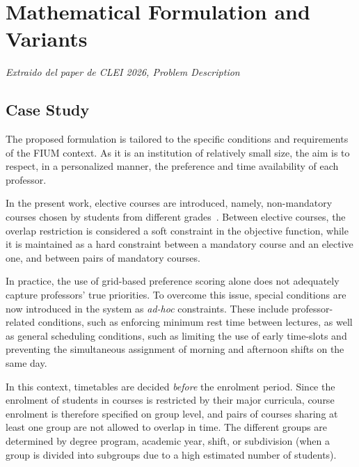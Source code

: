 \section{Mathematical Formulation and Variants}

\textit{Extraido del paper de CLEI 2026, Problem Description}


\subsection{Case Study}

The proposed formulation is tailored to the specific conditions and requirements of the FIUM context. As it is an institution of relatively small size, the aim is to respect, in a personalized manner, the preference and time availability of each professor.


In the present work, elective courses are introduced, namely, non-mandatory courses chosen by students from different grades~\cite{kristiansen2011elective}. Between elective courses, the overlap restriction is considered a soft constraint in the objective function, while it is maintained as a hard constraint between a mandatory course and an elective one, and between pairs of mandatory courses.

In practice, the use of grid-based preference scoring alone does not adequately capture professors' true priorities. To overcome this issue, special conditions are now introduced in the system as \textit{ad-hoc} constraints. These include professor-related conditions, such as enforcing minimum rest time between lectures, as well as general scheduling conditions, such as limiting the use of early time-slots and preventing the simultaneous assignment of morning and afternoon shifts on the same day.


In this context, timetables are decided \textit{before} the enrolment period. Since the enrolment of students in courses is restricted by their major curricula, course enrolment is therefore specified on group level, and pairs of courses sharing at least one group are not allowed to overlap in time. The different groups are determined by degree program, academic year, shift, or subdivision (when a group is divided into subgroups due to a high estimated number of students).




